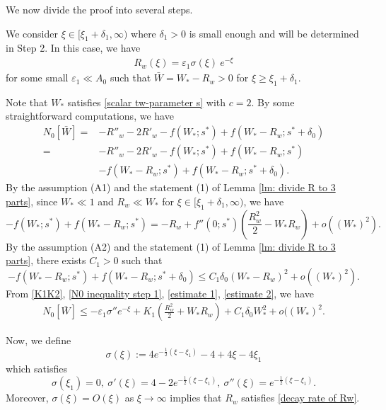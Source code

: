 \documentclass[11pt,a4paper]{article}
\numberwithin{equation}{section}
\numberwithin{figure}{section}
\newcommand\bea{\begin{eqnarray}}
\newcommand\eea{\end{eqnarray}}
\newcommand\beaa{\begin{eqnarray*}}
\newcommand\eeaa{\end{eqnarray*}}
\begin{document}

\medskip





We now divide the proof into several steps.

 We consider $\xi\in[\xi_1+\delta_1,\infty)$ where $\delta_1>0$ is small enough and will be determined in Step 2.
In this case, we have
\beaa
R_w(\xi)=\varepsilon_1\sigma(\xi)\ e^{-\xi}
\eeaa
for some small $\varepsilon_1\ll A_0$ 
such that $\bar W=W_*-R_w>0$ for $\xi\geq \xi_1+\delta_1$.



Note that $W_*$ satisfies \eqref{scalar tw-parameter s} with $c=2$.
By some  straightforward computations, we have
\begin{equation}\label{N0 inequality step 1}
\begin{aligned}
N_0[\bar W]=&-R''_w-2 R'_w-f(W_*;s^*)+f(W_*-R_w;s^*+\delta_0)\\
=&-R''_w-2 R'_w-f(W_*;s^*)+f(W_*-R_w;s^*)\\
&-f(W_*-R_w;s^*)+f(W_*-R_w;s^*+\delta_0).
\end{aligned}
\end{equation}
By the assumption (A1) and the statement (1) of Lemma \ref{lm: divide R to 3 parts}, since $W_*\ll 1$ and $R_w\ll W_*$ for $\xi\in[\xi_1+\delta_1,\infty)$, we have
\begin{equation}\label{estimate 1}
-f(W_*;s^*)+f(W_*-R_w;s^*)= -R_w+f''(0;s^*)(\frac{R^2_w}{2}-W_*R_w)+o((W_*)^2).
\end{equation}
By the assumption (A2) and the statement (1) of Lemma \ref{lm: divide R to 3 parts}, there exists $C_1>0$ such that
\begin{equation}\label{estimate 2}
-f(W_*-R_w;s^*)+f(W_*-R_w;s^*+\delta_0)\le C_1\delta_0(W_*-R_w)^2+o((W_*)^2).
\end{equation}
From \eqref{K1K2}, \eqref{N0 inequality step 1}, \eqref{estimate 1}, \eqref{estimate 2}, %
we have
\bea\label{estimate 3}
N_0[\bar W]\le -\varepsilon_1\sigma''e^{-\xi}+K_1(\frac{R_w^2}{2}+W_*R_w)+C_1\delta_0W_*^2+o((W_*)^2.
\eea


Now, we define
$$\sigma(\xi):=4e^{-\frac{1}{2}(\xi-\xi_1)}-4+4\xi-4\xi_1$$
which satisfies 
$$\sigma(\xi_1)=0,\ \sigma'(\xi)=4-2e^{-\frac{1}{2}(\xi-\xi_1)},\ \sigma''(\xi)=e^{-\frac{1}{2}(\xi-\xi_1)}.$$
Moreover, $\sigma(\xi)= O(\xi)$ as $\xi\to\infty$ implies that $R_w$ satisfies \eqref{decay rate of Rw}.
\end{document}
